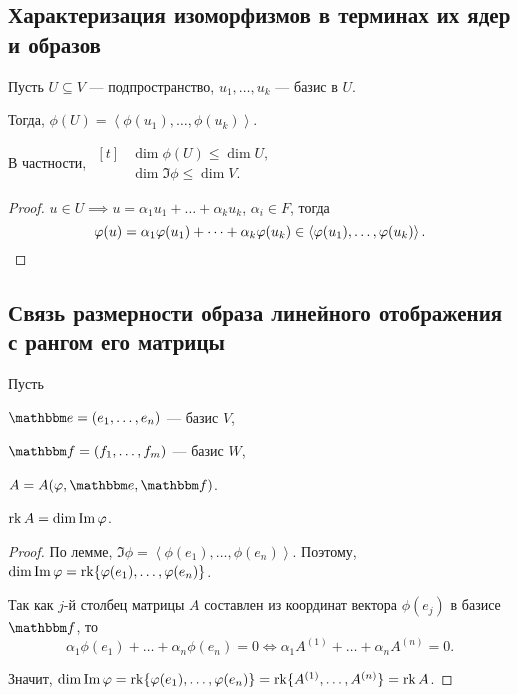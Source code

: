 \subsection{Характеризация изоморфизмов в терминах их ядер и образов}

Пусть $U \subseteq V$ --- подпространство, $u_1, \dots, u_k$ --- базис в $U$.

\begin{lemma}
    Тогда, $\phi(U) = \left< \phi(u_1), \dots, \phi(u_k) \right>$.

    В частности,
    \begin{math}
        \begin{aligned}[t]
            &\dim \phi(U) \leq \dim U, \\
            &\dim \Im \phi \leq \dim V.
        \end{aligned}
    \end{math}
\end{lemma}

\begin{proof}
    $u \in U \implies u = \alpha_1 u_1 + \dots + \alpha_k u_k$, $\alpha_i \in F$, тогда
    \begin{equation*}
        \phi(u) = \alpha_1 \phi(u_1) + \dots + \alpha_k \phi(u_k) \in \left< \phi(u_1), \dots, \phi(u_k) \right>
    .\qedhere\end{equation*}
\end{proof}


\subsection{Связь размерности образа линейного отображения с рангом его матрицы}

Пусть 

$\E = (e_1, \dots, e_n)$ --- базис $V$,

$\F = (f_1, \dots, f_m)$ --- базис $W$,

$A = A(\phi, \E, \F)$.

\begin{theorem}
    $\rk A = \dim \Im \phi$.
\end{theorem}

\begin{proof}
    По лемме, $\Im \phi = \left< \phi(e_1), \dots, \phi(e_n) \right>$. Поэтому, $\dim \Im \phi = \rk \{\phi(e_1), \dots, \phi(e_n)\}$.

    Так как $j$-й столбец матрицы $A$ составлен из координат вектора $\phi(e_j)$ в базисе $\F$, то
    \begin{equation*}
        \alpha_1 \phi(e_1) + \dots + \alpha_n \phi(e_n) = 0 \iff \alpha_1 A^{(1)} + \dots + \alpha_n A^{(n)} = 0
    .\end{equation*}

    Значит, $\dim \Im \phi = \rk \{\phi(e_1), \dots, \phi(e_n)\} = \rk \{A^{(1)}, \dots, A^{(n)}\} = \rk A$.
\end{proof}

